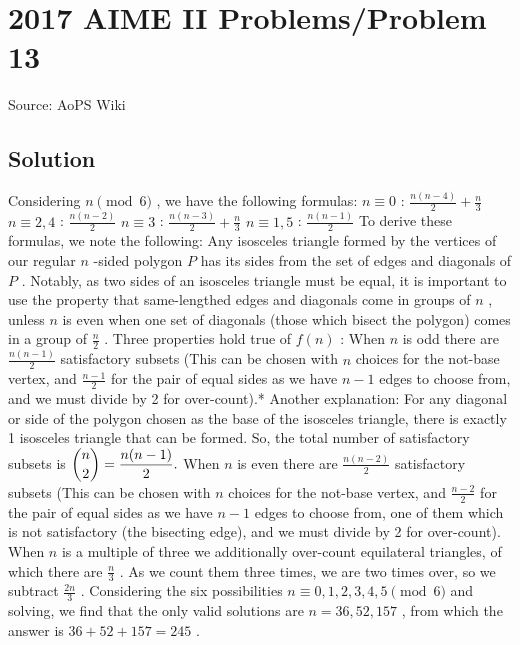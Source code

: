 \documentclass[12pt]{article}
\begin{document}
\section*{{2017 AIME II Problems/Problem 13}}
Source: AoPS Wiki

\subsection*{Solution}
Considering $n \pmod{6}$ , we have the following formulas: $n\equiv 0$ : $\frac{n(n-4)}{2} + \frac{n}{3}$ $n\equiv 2, 4$ : $\frac{n(n-2)}{2}$ $n\equiv 3$ : $\frac{n(n-3)}{2} + \frac{n}{3}$ $n\equiv 1, 5$ : $\frac{n(n-1)}{2}$ To derive these formulas, we note the following:
Any isosceles triangle formed by the vertices of our regular $n$ -sided polygon $P$ has its sides from the set of edges and diagonals of $P$ . Notably, as two sides of an isosceles triangle must be equal, it is important to use the property that same-lengthed edges and diagonals come in groups of $n$ , unless $n$ is even when one set of diagonals (those which bisect the polygon) comes in a group of $\frac{n}{2}$ . Three properties hold true of $f(n)$ : When $n$ is odd there are $\frac{n(n-1)}{2}$ satisfactory subsets (This can be chosen with $n$ choices for the not-base vertex, and $\frac{n-1}{2}$ for the pair of equal sides as we have $n-1$ edges to choose from, and we must divide by 2 for over-count).* Another explanation: For any diagonal or side of the polygon chosen as the base of the isosceles triangle, there is exactly 1 isosceles triangle that can be formed. So, the total number of satisfactory subsets is $\dbinom{n}{2}=\dfrac{n(n-1)}{2}.$ When $n$ is even there are $\frac{n(n-2)}{2}$ satisfactory subsets (This can be chosen with $n$ choices for the not-base vertex, and $\frac{n-2}{2}$ for the pair of equal sides as we have $n-1$ edges to choose from, one of them which is not satisfactory (the bisecting edge), and we must divide by 2 for over-count). When $n$ is a multiple of three we additionally over-count equilateral triangles, of which there are $\frac{n}{3}$ . As we count them three times, we are two times over, so we subtract $\frac{2n}{3}$ . Considering the six possibilities $n \equiv 0,1,2,3,4,5 \pmod{6}$ and solving, we find that the only valid solutions are $n = 36, 52, 157$ , from which the answer is $36 + 52 + 157 = \boxed{245}$ .
\end{document}
